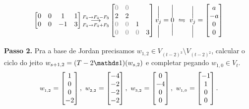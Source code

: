 {{{\[\begin{bmatrix}
    0 & 0 & 1 & 1 \\
    0 & 0 & -1 & 3 
\end{bmatrix}
\text{\small $ \underset{F_4 \to F_4 + F_3}{\overset{F_4 \to F_4 - F_3}{\longrightarrow }} $} 
\begin{bmatrix}
    \textcolor{gray}{0} & \textcolor{gray}{0} &  & \\
    2 & 2 &  &  \\
    \textcolor{gray}{0} & \textcolor{gray}{0} & 1 &  \\
    \textcolor{gray}{0} & \textcolor{gray}{0} & \textcolor{gray}{0} & 3 
\end{bmatrix} 
\overset{\Big|}{\underset{\Big|}{v_j}}
= \overset{\Big|}{\underset{\Big|}{0}}
 \ \leftrightharpoons \ 
\overset{\Big|}{\underset{\Big|}{v_j}}
 =  \begin{bmatrix}
    a \\ -a \\ 0 \\ 0
\end{bmatrix} 
\]
}
\par\noindent\textbf{Passo 2.} Pra a base de Jordan precisamos \(w_{1,2} \in V_{(t-2)^3} \setminus V_{(t-2)^2}\), calcular o ciclo do jeito \(w_{s+1, 2} = (T-2\id)(w_{s,2})\) e completar pegando \(w_{1,0} \in V_t\). 
{\footnotesize \[\text{\small $w_{_{1,2}}$} = \begin{bmatrix} 1 \\ 0 \\ 0 \\ -2\end{bmatrix}, \ \text{\small $w_{_{2,2}}$}  = \begin{bmatrix} -4 \\ -2 \\ -2 \\ -2\end{bmatrix}, \ \text{\small $w_{_{3,2}}$} = \begin{bmatrix} 0 \\ -4 \\ 0 \\ 0  \end{bmatrix} , \ \text{\small $w_{_{1,0}}$} = \begin{bmatrix} -1 \\ 1 \\ 0 \\ 0  \end{bmatrix}. \]}
}}
